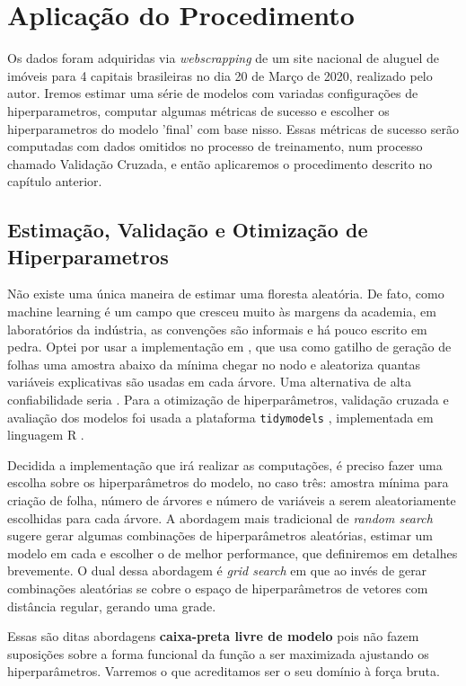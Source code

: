 

\chapter{Aplicação do Procedimento}

Os dados foram adquiridas via \textit{webscrapping} de um site nacional de aluguel de imóveis para 4 capitais brasileiras no dia 20 de Março de 2020, realizado pelo autor. Iremos estimar uma série de modelos com variadas configurações de hiperparametros, computar algumas métricas de sucesso e escolher os hiperparametros do modelo 'final' com base nisso. Essas métricas de sucesso serão computadas com dados omitidos no processo de treinamento, num processo chamado Validação Cruzada, e então aplicaremos o procedimento descrito no capítulo anterior.

\section{Estimação, Validação e Otimização de Hiperparametros}


Não existe uma única maneira de estimar uma floresta aleatória. De fato, como machine learning é um campo que cresceu muito às margens da academia, em laboratórios da indústria, as convenções são informais e há pouco escrito em pedra. Optei por usar a implementação em , que usa como gatilho de geração de folhas uma amostra abaixo da mínima chegar no nodo e aleatoriza quantas variáveis explicativas são usadas em cada árvore. Uma alternativa de alta confiabilidade seria . Para a otimização de hiperparâmetros, validação cruzada e avaliação dos modelos foi usada a plataforma \texttt{tidymodels} \cite{tidymodels}, implementada em linguagem R \cite{R}.

Decidida a implementação que irá realizar as computações, é preciso fazer uma escolha sobre os hiperparâmetros do modelo, no caso três: amostra mínima para criação de folha, número de árvores e número de variáveis a serem aleatoriamente escolhidas para cada árvore. A abordagem mais tradicional de \textit{random search} sugere gerar algumas combinações de hiperparâmetros aleatórias, estimar um modelo em cada e escolher o de melhor performance, que definiremos em detalhes brevemente. O dual dessa abordagem é \textit{grid search} em que ao invés de gerar combinações aleatórias se cobre o espaço de hiperparâmetros de vetores com distância regular, gerando uma grade. 

Essas são ditas abordagens \textbf{caixa-preta livre de modelo} pois não fazem suposições sobre a forma funcional da função a ser maximizada ajustando os hiperparâmetros. Varremos o que acreditamos ser o seu domínio à força bruta.  


